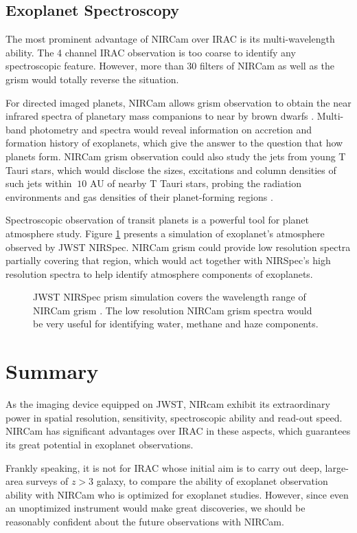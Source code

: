 \documentclass[preprint, 12pt]{aastex}
\begin{document}
\subsection{Exoplanet Spectroscopy}
The most prominent advantage of NIRCam over IRAC is its
multi-wavelength ability. The 4 channel IRAC observation is too coarse
to identify any spectroscopic feature. However, more than 30 filters
of NIRCam as well as the grism would totally reverse the situation.

For directed imaged planets, NIRCam allows grism observation to obtain
the near infrared spectra of planetary mass companions to near by
brown dwarfs \citep{2005SPIE.5905..185G}. Multi-band photometry and spectra
would reveal information on accretion and formation history of
exoplanets, which give the answer to the question that how planets
form. NIRCam grism observation could also study the jets from young T
Tauri stars, which would disclose  the sizes, excitations and column
densities of such jets within $~10$ AU of nearby T Tauri stars,
probing the radiation environments and gas densities of their
planet-forming regions \citep{2005SPIE.5905..185G}.\par

Spectroscopic observation of transit planets is a powerful tool for
planet atmosphere study. Figure \ref{fig:spec} presents a simulation
of exoplanet's atmosphere observed by JWST NIRSpec. NIRCam grism could
provide low resolution spectra partially covering that region, which
would act together with NIRSpec's high resolution spectra to help
identify atmosphere components of exoplanets.
\begin{figure}[h]
  \centering
  \caption{JWST NIRSpec prism simulation covers the wavelength range
    of NIRCam grism \citep{2013ApJ...775...80F}. The low resolution NIRCam
    grism spectra would be very useful for identifying water, methane
    and haze components.}
  \label{fig:spec}
\end{figure}

\section{Summary}
As the imaging device equipped on JWST, NIRcam exhibit its
extraordinary power in spatial resolution, sensitivity, spectroscopic
ability and read-out speed. NIRCam has significant advantages over
IRAC in these aspects, which guarantees its great potential in
exoplanet observations.

Frankly speaking, it is not for IRAC whose initial aim is to carry out
deep, large-area surveys of $z>3$ galaxy, to compare the ability of
exoplanet observation ability with NIRCam who is optimized for exoplanet
studies. However, since even an unoptimized instrument would make great
discoveries, we should be reasonably confident about the future
observations with NIRCam.
\nocite{*}

\end{document}

